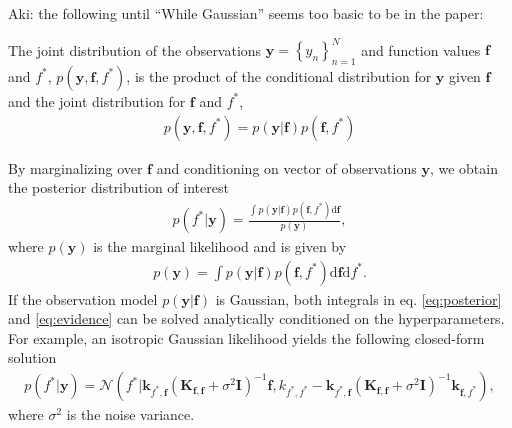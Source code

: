 \documentclass[]{interact}
\theoremstyle{plain}%
\theoremstyle{definition}
\theoremstyle{remark}
\begin{document}
{\color{red} Aki: the following until ``While Gaussian'' seems too basic to be in the paper:}

The joint distribution of the observations $\mathbf{y} = \left\lbrace y_n \right\rbrace_{n=1}^N$ and function values $\mathbf{f}$ and $f^*$, $p(\mathbf{y}, \mathbf{f}, f^*)$, is the product of the conditional distribution for $\mathbf{y}$ given $\mathbf{f}$ and the joint distribution for $\mathbf{f}$ and $f^*$,
\begin{align*}
	p(\mathbf{y}, \mathbf{f}, f^*) = p(\mathbf{y}|\mathbf{f})p(\mathbf{f}, f^*)
\end{align*}
 
By marginalizing over $\mathbf{f}$ and conditioning on vector of observations $\mathbf{y}$, we obtain the posterior distribution of interest
%
\begin{align}\label{eq:posterior}
	p(f^*|\mathbf{y}) = \frac{\int p(\mathbf{y}|\mathbf{f})p(\mathbf{f}, f^*)\text{d}\mathbf{f}}{p(\mathbf{y})},
\end{align}
where $p(\mathbf{y})$ is the marginal likelihood and is given by
%
\begin{align}\label{eq:evidence}
	p(\textbf{y}) = \int p(\mathbf{y}|\mathbf{f})p(\mathbf{f}, f^*) \text{d}\bm{f}\text{d}f^*.
\end{align}
%
If the observation model $p(\mathbf{y}|\mathbf{f})$ is Gaussian, both integrals in eq. \eqref{eq:posterior} and \eqref{eq:evidence} can be solved analytically conditioned on the hyperparameters. For example, an isotropic Gaussian likelihood yields the following closed-form solution
\begin{align*}
	p(f^*| \mathbf{y}) = \mathcal{N}(f^*| \textbf{k}_{f^*,\mathbf{f}} (\textbf{K}_{\mathbf{f},\mathbf{f}} + \sigma^2 \mathbf{I})^{-1} \mathbf{f},  k_{f^*,f^*}-\mathbf{k}_{f^*,\mathbf{f}} (\mathbf{K}_{\mathbf{f},\mathbf{f}} + \sigma^2 \mathbf{I})^{-1} \mathbf{k}_{\mathbf{f},f^*}  ),
\end{align*}
where $\sigma^2$ is the noise variance.
\end{document}
